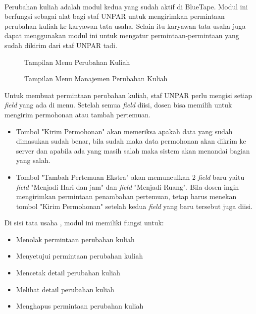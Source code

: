 \paragraph{} Perubahan kuliah adalah modul kedua yang sudah aktif di BlueTape. Modul ini berfungsi sebagai alat bagi staf UNPAR untuk mengirimkan permintaan perubahan kuliah ke karyawan tata usaha. Selain itu karyawan tata usaha juga dapat menggunakan modul ini untuk mengatur permintaan-permintaan yang sudah dikirim dari staf UNPAR tadi. 
\begin{figure} [H]
	\centering  
	\caption[Tampilan Menu Perubahan Kuliah]{Tampilan Menu Perubahan Kuliah} 
\end{figure}
\begin{figure} [H]
	\centering  
	\caption[Tampilan Menu Manajemen Perubahan Kuliah]{Tampilan Menu Manajemen Perubahan Kuliah} 
\end{figure}
Untuk membuat permintaan perubahan kuliah, staf UNPAR perlu mengisi setiap \textit{field} yang ada di menu. Setelah semua \textit{field} diisi, dosen bisa memilih untuk mengirim permohonan atau tambah pertemuan.
\begin{itemize}
	\item Tombol "Kirim Permohonan" akan memeriksa apakah data yang sudah dimasukan sudah benar, bila sudah maka data permohonan akan dikrim ke server dan apabila ada yang masih salah maka sistem akan menandai bagian yang salah.
	
	\item Tombol "Tambah Pertemuan Ekstra" akan memunculkan 2 \textit{field} baru yaitu \textit{field} "Menjadi Hari dan jam" dan \textit{field} "Menjadi Ruang". Bila dosen ingin mengirimkan permintaan penambahan pertemuan, tetap harus menekan tombol "Kirim Permohonan" setelah kedua \textit{field} yang baru tersebut juga diisi.
\end{itemize}
Di sisi tata usaha , modul ini memiliki fungsi untuk:
\begin{itemize}
	\item Menolak permintaan perubahan kuliah
	\item Menyetujui permintaan perubahan kuliah
	\item Mencetak detail perubahan kuliah
	\item Melihat detail perubahan kuliah
	\item Menghapus permintaan perubahan kuliah
\end{itemize}
 
